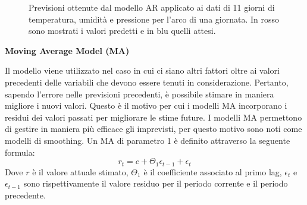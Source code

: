 \documentclass{article}
\begin{document}
\begin{figure}
    \centering
    \qquad
    \qquad
    \caption{Previsioni ottenute dal modello AR applicato ai dati di 11 giorni di temperatura, umidità e pressione per l'arco di una giornata. In rosso sono mostrati i valori predetti e in blu quelli attesi.}
    \label{fig:ar}
\end{figure}


\bigskip
\textbf{Moving Average Model (MA)}
\medskip

Il modello viene utilizzato nel caso in cui ci siano altri fattori oltre ai valori precedenti delle variabili che devono essere tenuti in considerazione. Pertanto, sapendo l'errore nelle previsioni precedenti, è possibile stimare in maniera migliore i nuovi valori. Questo è il motivo per cui i modelli MA incorporano i residui dei valori passati per migliorare le stime future. I modelli MA permettono di gestire in maniera più efficace gli imprevisti, per questo motivo sono noti come modelli di smoothing. Un MA di parametro 1 è definito attraverso la seguente formula\cite{arima}:
$$r_t = c + \Theta_1\epsilon_{t-1} + \epsilon_t$$
Dove $r$ è il valore attuale stimato, $\Theta_1$ è il coefficiente associato al primo lag, $\epsilon_t$ e $\epsilon_{t-1}$ sono rispettivamente il valore residuo per il periodo corrente e il periodo precedente.
\end{document}
